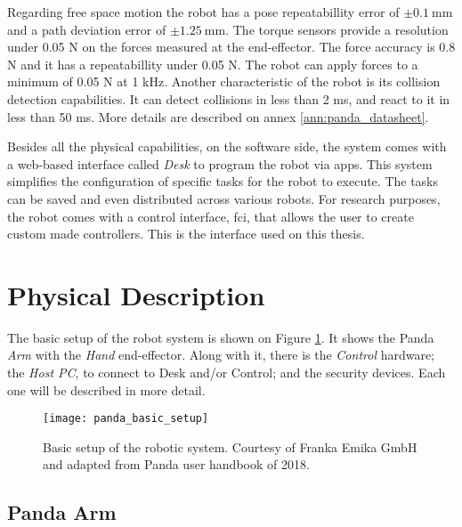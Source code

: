 Regarding free space motion the robot has a pose repeatabillity error of $\pm \SI{0.1}{\milli\meter}$ and a path deviation error of $\pm \SI{1.25}{\milli\meter}$. The torque sensors provide a resolution under 0.05 N on the forces measured at the end-effector. The force accuracy is 0.8 N and it has a repeatabillity under 0.05 N. The robot can apply forces to a minimum of 0.05 N at 1 kHz. Another characteristic of the robot is its collision detection capabilities. It can detect collisions in less than 2 ms, and react to it in less than 50 ms. More details are described on annex \ref{ann:panda_datasheet}.

Besides all the physical capabilities, on the software side, the system comes with a web-based interface called \emph{Desk} to program the robot via apps. This system simplifies the configuration of specific tasks for the robot to execute. The tasks can be saved and even distributed across various robots. For research purposes, the robot comes with a control interface, \gls{fci}, that allows the user to create custom made controllers. This is the interface used on this thesis.



\section{Physical Description}
\label{sec:robotic_system_physical_description}

The basic setup of the robot system is shown on Figure \ref{fig:robotic_system_basic_setup}. It shows the Panda \emph{Arm} with the \emph{Hand} end-effector. Along with it, there is the \emph{Control} hardware; the \emph{Host PC}, to connect to Desk and/or Control; and the security devices. Each one will be described in more detail.

\begin{figure}[htbp]
	\centering
	\texttt{[image: panda\_basic\_setup]}
	\caption[Basic setup of the robotic system.]{Basic setup of the robotic system. Courtesy of Franka Emika GmbH and adapted from Panda user handbook of 2018.}
	\label{fig:robotic_system_basic_setup}
\end{figure}

\subsection*{Panda Arm}
\label{subsec:robotic_system_physical_description_panda_arm}

